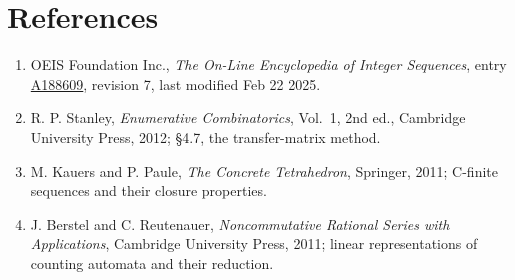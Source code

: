 \documentclass[11pt]{article}
\theoremstyle{definition}
\begin{document}
\section{References}

\begin{enumerate}

\item OEIS Foundation Inc., \emph{The On-Line Encyclopedia of Integer Sequences}, entry \href{https://oeis.org/A188609}{A188609}, revision 7, last modified Feb 22 2025.

\item R. P. Stanley, \emph{Enumerative Combinatorics}, Vol.~1, 2nd ed., Cambridge University Press, 2012; \S4.7, the transfer-matrix method.

\item M. Kauers and P. Paule, \emph{The Concrete Tetrahedron}, Springer, 2011; C-finite sequences and their closure properties.

\item J. Berstel and C. Reutenauer, \emph{Noncommutative Rational Series with Applications}, Cambridge University Press, 2011; linear representations of counting automata and their reduction.

\end{enumerate}
\end{document}
